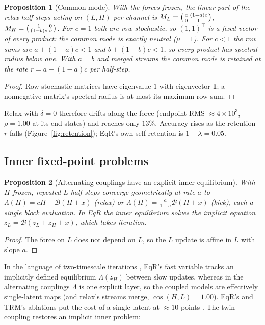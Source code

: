 \documentclass[11pt]{article}
\newtheorem{proposition}{Proposition}
\theoremstyle{definition}
\newcommand{\zH}{z_H}
\newcommand{\zL}{z_L}
\newcommand{\Bk}{\mathcal{B}}
\begin{document}
\begin{proposition}[Common mode]\label{prop:neutral}
With the forces frozen, the linear part of the relax half-steps acting on $(L,H)$ per channel is
$M_L=\begin{psmallmatrix}a&(1-a)c\\0&1\end{psmallmatrix}$, $M_H=\begin{psmallmatrix}1&0\\(1-b)c&b\end{psmallmatrix}$.
For $c=1$ both are row-stochastic, so $(1,1)^\top$ is a fixed vector of every product: the common mode is exactly neutral ($\mu=1$).
For $c<1$ the row sums are $a+(1-a)c<1$ and $b+(1-b)c<1$, so every product has spectral radius below one.
With $a=b$ and merged streams the common mode is retained at the rate $r=a+(1-a)c$ per half-step.
\end{proposition}
\begin{proof}Row-stochastic matrices have eigenvalue $1$ with eigenvector $\mathbf 1$; a nonnegative matrix's spectral radius is
at most its maximum row sum.\end{proof}

\noindent Relax with $\delta=0$ therefore drifts along the force (endpoint RMS $\approx4\times10^3$, $\rho=1.00$ at its end states)
and reaches only $13\%$. Accuracy rises as the retention $r$ falls (Figure~\ref{fig:retention}); EqR's own self-retention is $1-\lambda=0.05$.

\subsection{Inner fixed-point problems}\label{sec:twin}

\begin{proposition}[Alternating couplings have an explicit inner equilibrium]\label{prop:explicit}
With $H$ frozen, repeated $L$ half-steps converge geometrically at rate $a$ to
$\Lambda(H)=cH+\Bk(H+x)$ (relax) or $\Lambda(H)=\tfrac{a}{1-a}\Bk(H+x)$ (kick), each a single block evaluation.
In EqR the inner equilibrium solves the implicit equation $\zL=\Bk(\zL+\zH+x)$, which takes iteration.
\end{proposition}
\begin{proof}The force on $L$ does not depend on $L$, so the $L$ update is affine in $L$ with slope $a$.\end{proof}

\noindent In the language of two-timescale iterations \cite{borkar1997twotimescale}, EqR's fast variable tracks an implicitly defined
equilibrium $\Lambda(\zH)$ between slow updates, whereas in the alternating couplings $\Lambda$ is one explicit layer, so the coupled
models are effectively single-latent maps (and relax's streams merge, $\cos(H,L)=1.00$). EqR's and TRM's ablations put the cost of a
single latent at $\approx10$ points \cite{huang2026eqr,jolicoeur2025trm}. The twin coupling restores an implicit inner problem:
\end{document}

